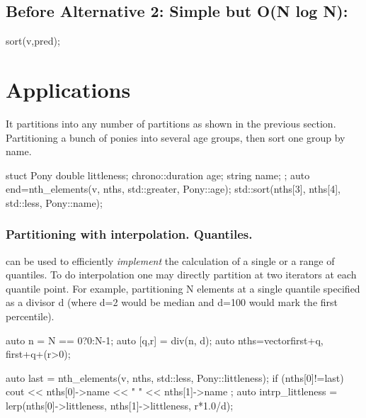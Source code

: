 \subsection*{Before \textnormal{Alternative 2: Simple but O(N log N):}}
\begin{codeblock}
sort(v,pred);
\end{codeblock}

\newpage
\section{Applications}

It partitions into any number of partitions as shown in the previous section. Partitioning a bunch of ponies into several age groups, then sort one group by name.

\begin{codeblock}
stuct Pony{
  double littleness; 
  chrono::duration age;
  string name;
};
auto end=nth_elements(v, nths, std::greater{}, Pony::age);
std::sort(nths[3], nths[4], std::less{}, Pony::name);
\end{codeblock}

\subsubsection*{Partitioning with interpolation. Quantiles.}


 can be used to efficiently \emph{implement} the calculation of a single or a range of quantiles.
To do interpolation one may directly partition at two iterators at each quantile point. For example, partitioning N elements at a single quantile specified as a divisor d (where d=2 would be median and d=100 would mark the first percentile).
\begin{codeblock}
auto n = N == 0?0:N-1;
auto [q,r] = div(n, d);
auto nths=vector{first+q, first+q+(r>0)}; 
\end{codeblock}

\begin{codeblock}
auto last = nth_elements(v, nths, std::less{}, Pony::littleness);
if (nths[0]!=last){
  cout << nths[0]->name << " " << nths[1]->name ; 
  auto intrp_littleness = lerp(nths[0]->littleness, nths[1]->littleness, r*1.0/d);
}
\end{codeblock}


